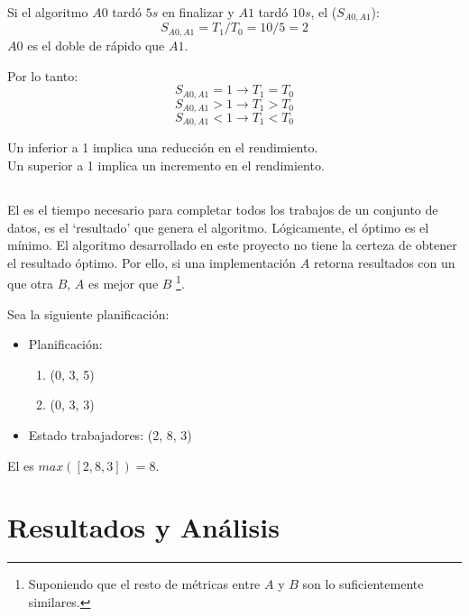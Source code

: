 \begin{examplebox}
    Si el algoritmo $A0$ tardó $5s$ en finalizar y
    $A1$ tardó $10s$, el  ($S_{A0,A1}$):
    $$
        S_{A0,A1} = T_1 / T_0 = 10 / 5 = 2
    $$
    $A0$ es el doble de rápido que $A1$.
\end{examplebox}

Por lo tanto:
$$ S_{A0,A1} = 1 \rightarrow T_1 = T_0 $$ 
$$ S_{A0,A1} > 1 \rightarrow T_1 > T_0 $$ 
$$ S_{A0,A1} < 1 \rightarrow T_1 < T_0 $$

\begin{keynotebox}
    Un  inferior a 1 implica una reducción en el rendimiento.\\
    Un  superior a 1 implica un incremento en el rendimiento. 
\end{keynotebox}

\subsection{}

El  es el tiempo necesario para completar
todos los trabajos de un conjunto de datos,
es el `resultado' que genera el algoritmo.
Lógicamente, el  óptimo es el mínimo.
El algoritmo desarrollado en este proyecto
no tiene la certeza de obtener el resultado óptimo.
Por ello, si una implementación $A$ retorna
resultados con un  que otra $B$,
$A$ es mejor que $B$ \footnote{
    Suponiendo que el resto de métricas entre $A$ y $B$
    son lo suficientemente similares.
}.

\begin{examplebox}
    Sea la siguiente planificación:
    \begin{itemize}[itemsep=0.25px]
        \item Planificación:
        \begin{enumerate}[itemsep=0.25px]
            \item (0, 3, 5)
            \item (0, 3, 3)
        \end{enumerate}
        \item Estado trabajadores: (2, 8, 3)
    \end{itemize}

    El  es $max([2, 8, 3]) = 8$.
\end{examplebox}

\section{Resultados y Análisis}

